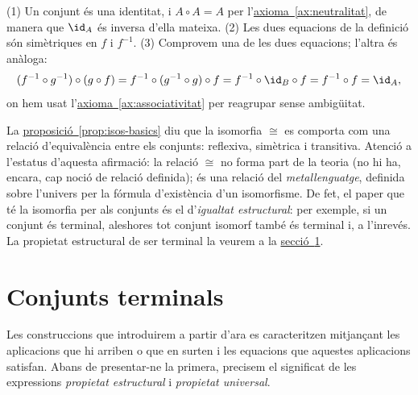 \begin{prova}
(1) Un conjunt és una identitat, i \(A \circ A = A\) per l'\hyperref[ax:neutralitat]{axioma~\ref*{ax:neutralitat}}, de manera que \(\id_A\) és inversa d'ella mateixa. (2) Les dues equacions de la definició són simètriques en \(f\) i \(f^{-1}\). (3) Comprovem una de les dues equacions; l'altra és anàloga:
\[
(f^{-1} \circ g^{-1}) \circ (g \circ f)
= f^{-1} \circ (g^{-1} \circ g) \circ f
= f^{-1} \circ \id_B \circ f
= f^{-1} \circ f
= \id_A,
\]
on hem usat l'\hyperref[ax:associativitat]{axioma~\ref*{ax:associativitat}} per reagrupar sense ambigüitat.
\end{prova}

\begin{observacio}\label{obs:isomorfia-equivalencia}
La \hyperref[prop:isos-basics]{proposició~\ref*{prop:isos-basics}} diu que la isomorfia \(\cong\) es comporta com una relació d'equivalència entre els conjunts: reflexiva, simètrica i transitiva. Atenció a l'estatus d'aquesta afirmació: la relació \(\cong\) no forma part de la teoria (no hi ha, encara, cap noció de relació definida); és una relació del \emph{metallenguatge}, definida sobre l'univers per la fórmula d'existència d'un isomorfisme. De fet, el paper que té la isomorfia per als conjunts és el d'\emph{igualtat estructural}: per exemple, si un conjunt és terminal, aleshores tot conjunt isomorf també és terminal i, a l'inrevés. La propietat estructural de ser terminal la veurem a la \hyperref[sec:terminals]{secció~\ref*{sec:terminals}}.
\end{observacio}


\section{Conjunts terminals}\label{sec:terminals}

Les construccions que introduirem a partir d'ara es caracteritzen
mitjançant les aplicacions que hi arriben o que en surten i les
equacions que aquestes aplicacions satisfan. Abans de presentar-ne
la primera, precisem el significat de les expressions
\emph{propietat estructural} i \emph{propietat universal}. 

